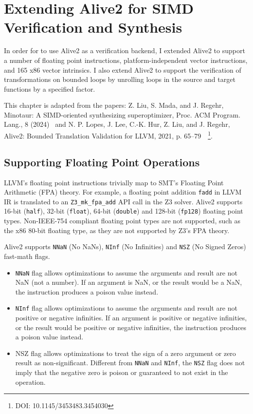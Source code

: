 \chapter{Extending Alive2 for SIMD Verification and Synthesis}
\label{chap:extending-alive2}

In order for \minotaur{} to use Alive2 as a verification backend, I extended
Alive2 to support a number of floating point instructions,
platform-independent vector instructions, and 165 x86 vector intrinsics.
%
I also extend Alive2 to support the verification of transformations on
bounded loops by unrolling loops in the source and target functions by
a specified factor.

This chapter is adapted from the papers: Z. Liu, S. Mada, and J. Regehr, Minotaur:
A SIMD-oriented synthesizing superoptimizer, Proc. ACM Program.
Lang., 8 (2024)~\cite{minotaur} and
N. P. Lopes, J. Lee, C.-K. Hur, Z. Liu, and J. Regehr, Alive2: Bounded Translation
Validation for LLVM, 2021, p. 65–79~\cite{alive2}~\footnote{DOI: 10.1145/3453483.3454030}.


\section{Supporting Floating Point Operations}

LLVM's floating point instructions trivially map to SMT's Floating
Point Arithmetic (FPA) theory.
%
For example, a floating point addition \texttt{fadd} in LLVM IR is
translated to an \texttt{Z3\_mk\_fpa\_add} API call in the Z3 solver.
%
Alive2 supports 16-bit (\texttt{half}), 32-bit (\texttt{float}), 64-bit
(\texttt{double}) and 128-bit (\texttt{fp128}) floating point types.
%
Non-IEEE-754 compliant floating point types are not supported, such as
the x86 80-bit floating type, as they are not supported by Z3's FPA
theory.

Alive2 supports \texttt{NNaN} (No NaNs), \texttt{NInf} (No Infinities) and
\texttt{NSZ} (No Signed Zeros) fast-math flags.

\begin{itemize}

\item \texttt{NNaN} flag allows optimizations to assume the arguments
and result are not NaN (not a number). If an argument is
NaN, or the result would be a NaN, the instruction produces a
poison value instead.

\item \texttt{NInf} flag allows optimizations to assume the arguments
and result are not positive or negative infinities. If an argument is
positive or negative infinities, or the result would be positive or
negative infinities, the instruction produces a poison value instead.

\item NSZ flag allows optimizations to treat the sign of a zero
argument or zero result as non-significant. Different from
\texttt{NNaN} and \texttt{NInf}, the \texttt{NSZ} flag does not imply
that the negative zero is poison or guaranteed to not exist in the
operation.

\end{itemize}

